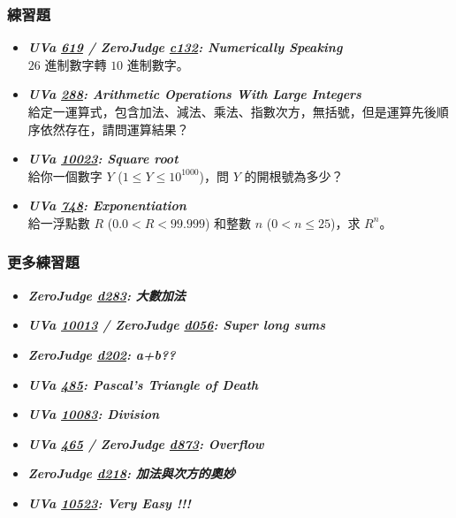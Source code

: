 \subsubsection*{練習題}
\begin{itemize}[label={\Checkmark}]
\item \textbf{\textit{UVa \href{http://uva.onlinejudge.org/external/6/619.html}{619} / ZeroJudge \href{http://zerojudge.tw/ShowProblem?problemid=c132}{c132}: Numerically Speaking}}\\
$26$ 進制數字轉 $10$ 進制數字。
\item \textbf{\textit{UVa \href{http://uva.onlinejudge.org/external/2/288.html}{288}: Arithmetic Operations With Large Integers}}\\
給定一運算式，包含加法、減法、乘法、指數次方，無括號，但是運算先後順序依然存在，請問運算結果？
\item \textbf{\textit{UVa \href{http://uva.onlinejudge.org/external/100/10023.html}{10023}: Square root}}\\
給你一個數字 $Y$ ($1\leq{Y}\leq{10^{1000}}$)，問 $Y$ 的開根號為多少？
\item \textbf{\textit{UVa \href{http://uva.onlinejudge.org/external/7/748.html}{748}: Exponentiation}}\\
給一浮點數 $R$ ($0.0<R<99.999$) 和整數 $n$ ($0<n\leq{25}$)，求 $R^n$。
\end{itemize}
\subsubsection*{更多練習題}
\begin{itemize}[label={\PencilLeftDown}]
\item \textbf{\textit{ZeroJudge \href{http://zerojudge.tw/ShowProblem?problemid=d283}{d283}: 大數加法}}
\item \textbf{\textit{UVa \href{http://uva.onlinejudge.org/external/100/10013.html}{10013} / ZeroJudge \href{http://zerojudge.tw/ShowProblem?problemid=d056}{d056}: Super long sums}}
\item \textbf{\textit{ZeroJudge \href{http://zerojudge.tw/ShowProblem?problemid=d202}{d202}: a+b??}}
\item \textbf{\textit{UVa \href{http://uva.onlinejudge.org/external/4/485.html}{485}: Pascal's Triangle of Death}}
\item \textbf{\textit{UVa \href{http://uva.onlinejudge.org/external/100/10083.html}{10083}: Division}}
\item \textbf{\textit{UVa \href{http://uva.onlinejudge.org/external/4/465.html}{465} / ZeroJudge \href{http://zerojudge.tw/ShowProblem?problemid=d873}{d873}: Overflow}}
\item \textbf{\textit{ZeroJudge \href{http://zerojudge.tw/ShowProblem?problemid=d218}{d218}: 加法與次方的奧妙}}
\item \textbf{\textit{UVa \href{http://uva.onlinejudge.org/external/105/10523.html}{10523}: Very Easy !!!}}
\end{itemize}